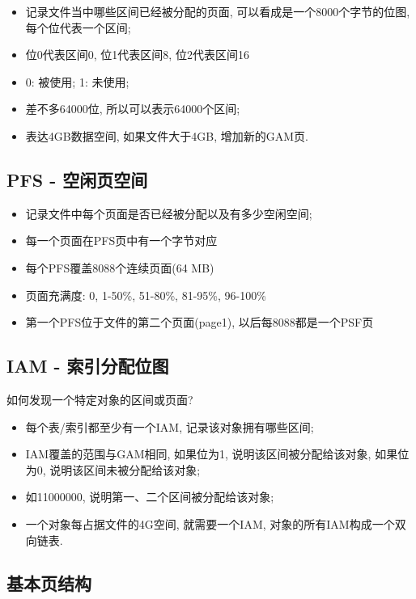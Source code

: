 \begin{itemize}
    \item 记录文件当中哪些区间已经被分配的页面, 可以看成是一个8000个字节的位图, 每个位代表一个区间;
    \item 位0代表区间0, 位1代表区间8, 位2代表区间16
    \item 0: 被使用; 1: 未使用;
    \item 差不多64000位, 所以可以表示64000个区间;
    \item 表达4GB数据空间, 如果文件大于4GB, 增加新的GAM页.
\end{itemize}

\subsection{PFS - 空闲页空间}

\begin{itemize}
    \item 记录文件中每个页面是否已经被分配以及有多少空闲空间;
    \item 每一个页面在PFS页中有一个字节对应
    \item 每个PFS覆盖8088个连续页面(64 MB)
    \item 页面充满度: 0, 1-50\%, 51-80\%, 81-95\%, 96-100\%
    \item 第一个PFS位于文件的第二个页面(page1), 以后每8088都是一个PSF页
\end{itemize}

\subsection{IAM - 索引分配位图}

如何发现一个特定对象的区间或页面?
\begin{itemize}
    \item 每个表/索引都至少有一个IAM, 记录该对象拥有哪些区间;
    \item IAM覆盖的范围与GAM相同, 如果位为1, 说明该区间被分配给该对象, 如果位为0, 说明该区间未被分配给该对象;
    \item 如11000000, 说明第一、二个区间被分配给该对象;
    \item 一个对象每占据文件的4G空间, 就需要一个IAM, 对象的所有IAM构成一个双向链表.
\end{itemize}

\subsection{基本页结构}

